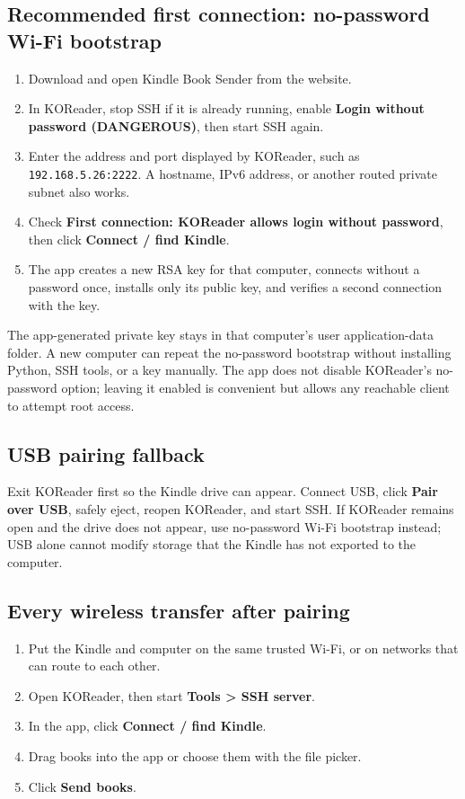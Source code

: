 \documentclass[10pt,letterpaper]{article}
\begin{document}
\subsection{Recommended first connection: no-password Wi-Fi bootstrap}

\begin{enumerate}
  \item Download and open Kindle Book Sender from the website.
  \item In KOReader, stop SSH if it is already running, enable \textbf{Login without password (DANGEROUS)}, then start SSH again.
  \item Enter the address and port displayed by KOReader, such as \texttt{192.168.5.26:2222}. A hostname, IPv6 address, or another routed private subnet also works.
  \item Check \textbf{First connection: KOReader allows login without password}, then click \textbf{Connect / find Kindle}.
  \item The app creates a new RSA key for that computer, connects without a password once, installs only its public key, and verifies a second connection with the key.
\end{enumerate}

The app-generated private key stays in that computer's user application-data folder. A new computer can repeat the no-password bootstrap without installing Python, SSH tools, or a key manually. The app does not disable KOReader's no-password option; leaving it enabled is convenient but allows any reachable client to attempt root access.

\subsection{USB pairing fallback}

Exit KOReader first so the Kindle drive can appear. Connect USB, click \textbf{Pair over USB}, safely eject, reopen KOReader, and start SSH. If KOReader remains open and the drive does not appear, use no-password Wi-Fi bootstrap instead; USB alone cannot modify storage that the Kindle has not exported to the computer.

\subsection{Every wireless transfer after pairing}

\begin{enumerate}
  \item Put the Kindle and computer on the same trusted Wi-Fi, or on networks that can route to each other.
  \item Open KOReader, then start \textbf{Tools > SSH server}.
  \item In the app, click \textbf{Connect / find Kindle}.
  \item Drag books into the app or choose them with the file picker.
  \item Click \textbf{Send books}.
\end{enumerate}
\end{document}
